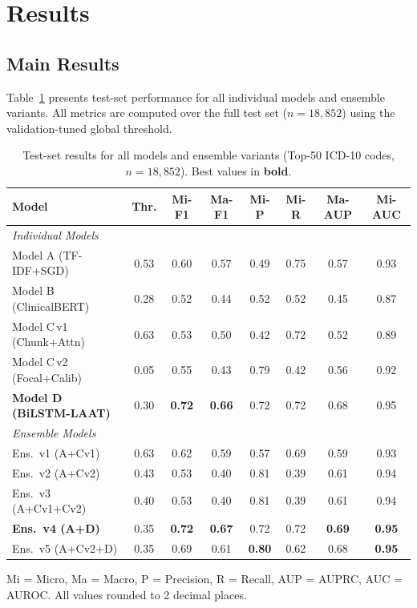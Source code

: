 \documentclass[11pt,a4paper]{article}
\begin{document}
\section{Results}

\subsection{Main Results}

Table~\ref{tab:main_results} presents test-set performance for all individual models and ensemble variants. All metrics are computed over the full test set ($n = 18{,}852$) using the validation-tuned global threshold.

\begin{table}[H]
\centering
\caption{Test-set results for all models and ensemble variants (Top-50 ICD-10 codes, $n = 18{,}852$). Best values in \textbf{bold}.}
\label{tab:main_results}
\small
\begin{tabular}{l c c c c c c c}
\toprule
\textbf{Model} & \textbf{Thr.} & \textbf{Mi-F1} & \textbf{Ma-F1} & \textbf{Mi-P} & \textbf{Mi-R} & \textbf{Ma-AUP} & \textbf{Mi-AUC} \\
\midrule
\multicolumn{8}{l}{\textit{Individual Models}} \\
\midrule
Model A (TF-IDF+SGD)      & 0.53 & 0.60 & 0.57 & 0.49 & 0.75 & 0.57 & 0.93 \\
Model B (ClinicalBERT)     & 0.28 & 0.52 & 0.44 & 0.52 & 0.52 & 0.45 & 0.87 \\
Model C\,v1 (Chunk+Attn)   & 0.63 & 0.53 & 0.50 & 0.42 & 0.72 & 0.52 & 0.89 \\
Model C\,v2 (Focal+Calib)  & 0.05 & 0.55 & 0.43 & 0.79 & 0.42 & 0.56 & 0.92 \\
\textbf{Model D (BiLSTM-LAAT)} & 0.30 & \textbf{0.72} & \textbf{0.66} & 0.72 & 0.72 & 0.68 & 0.95 \\
\midrule
\multicolumn{8}{l}{\textit{Ensemble Models}} \\
\midrule
Ens.\ v1 (A+Cv1)          & 0.63 & 0.62 & 0.59 & 0.57 & 0.69 & 0.59 & 0.93 \\
Ens.\ v2 (A+Cv2)          & 0.43 & 0.53 & 0.40 & 0.81 & 0.39 & 0.61 & 0.94 \\
Ens.\ v3 (A+Cv1+Cv2)      & 0.40 & 0.53 & 0.40 & 0.81 & 0.39 & 0.61 & 0.94 \\
\textbf{Ens.\ v4 (A+D)}   & 0.35 & \textbf{0.72} & \textbf{0.67} & 0.72 & 0.72 & \textbf{0.69} & \textbf{0.95} \\
Ens.\ v5 (A+Cv2+D)        & 0.35 & 0.69 & 0.61 & \textbf{0.80} & 0.62 & 0.68 & \textbf{0.95} \\
\bottomrule
\end{tabular}
\vspace{4pt}

{\footnotesize Mi = Micro, Ma = Macro, P = Precision, R = Recall, AUP = AUPRC, AUC = AUROC. All values rounded to 2 decimal places.}
\end{table}
\end{document}
